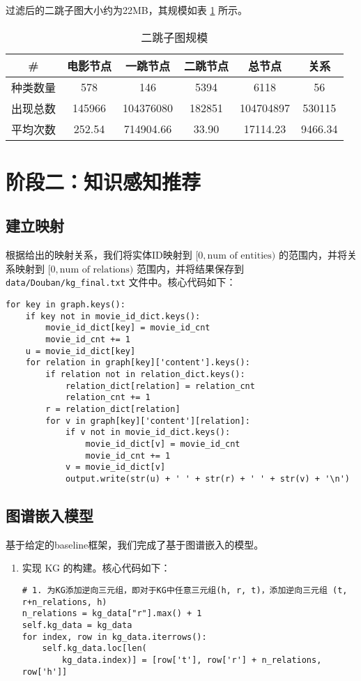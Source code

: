 \documentclass{ctexart}
\begin{document}
\begin{sloppypar}
    过滤后的二跳子图大小约为22MB，其规模如表 \ref{tab:1} 所示。

    \begin{table}[h]
        \centering
        \caption{二跳子图规模\label{tab:1}}
        \begin{tabular}{cccccc}
            \toprule
            \#       & 电影节点 & 一跳节点  & 二跳节点 & 总节点    & 关系    \\ \midrule
            种类数量 & 578      & 146       & 5394     & 6118      & 56      \\
            出现总数 & 145966   & 104376080 & 182851   & 104704897 & 530115  \\
            平均次数 & 252.54   & 714904.66 & 33.90    & 17114.23  & 9466.34 \\
            \bottomrule
        \end{tabular}
    \end{table}

    \section{阶段二：知识感知推荐}

    \subsection{建立映射}
    根据给出的映射关系，我们将实体ID映射到 $[0, \text{num of entities})$ 的范围内，并将关系映射到 $[0, \text{num of relations})$ 范围内，并将结果保存到 \texttt{data/Douban/kg\_final.txt} 文件中。核心代码如下：
    \begin{lstlisting}[style=python]
for key in graph.keys():
    if key not in movie_id_dict.keys():
        movie_id_dict[key] = movie_id_cnt
        movie_id_cnt += 1
    u = movie_id_dict[key]
    for relation in graph[key]['content'].keys():
        if relation not in relation_dict.keys():
            relation_dict[relation] = relation_cnt
            relation_cnt += 1
        r = relation_dict[relation]
        for v in graph[key]['content'][relation]:
            if v not in movie_id_dict.keys():
                movie_id_dict[v] = movie_id_cnt
                movie_id_cnt += 1
            v = movie_id_dict[v]
            output.write(str(u) + ' ' + str(r) + ' ' + str(v) + '\n')
\end{lstlisting}

    \subsection{图谱嵌入模型}
    基于给定的baseline框架，我们完成了基于图谱嵌入的模型。
    \begin{enumerate}
        \item 实现 KG 的构建。核心代码如下：
        \begin{lstlisting}[style=python]
# 1. 为KG添加逆向三元组，即对于KG中任意三元组(h, r, t)，添加逆向三元组 (t, r+n_relations, h)
n_relations = kg_data["r"].max() + 1
self.kg_data = kg_data
for index, row in kg_data.iterrows():
    self.kg_data.loc[len(
        kg_data.index)] = [row['t'], row['r'] + n_relations, row['h']]


\end{lstlisting}
\end{enumerate}
\end{sloppypar}
\end{document}
